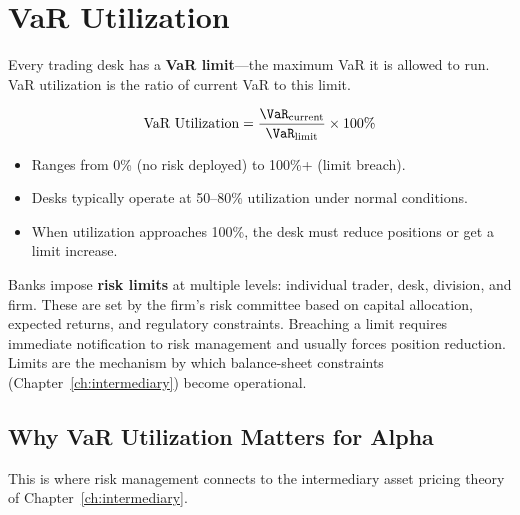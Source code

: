 \section{VaR Utilization}
\label{sec:var-utilization}

Every trading desk has a \textbf{VaR limit}---the maximum VaR it is
allowed to run.  VaR utilization is the ratio of current VaR to this
limit.

\begin{definition}
\begin{equation}
\label{eq:var-util}
\text{VaR Utilization} = \frac{\VaR_{\text{current}}}
  {\VaR_{\text{limit}}} \times 100\%
\end{equation}
\begin{itemize}[nosep]
  \item Ranges from 0\% (no risk deployed) to 100\%+ (limit breach).
  \item Desks typically operate at 50--80\% utilization under normal
        conditions.
  \item When utilization approaches 100\%, the desk must reduce
        positions or get a limit increase.
\end{itemize}
\end{definition}

\begin{prereq}
Banks impose \textbf{risk limits} at multiple levels: individual trader,
desk, division, and firm.  These are set by the firm's risk committee
based on capital allocation, expected returns, and regulatory
constraints.  Breaching a limit requires immediate notification to risk
management and usually forces position reduction.  Limits are the
mechanism by which balance-sheet constraints (Chapter~\ref{ch:intermediary})
become operational.
\end{prereq}

\subsection{Why VaR Utilization Matters for Alpha}

This is where risk management connects to the intermediary asset pricing
theory of Chapter~\ref{ch:intermediary}.

